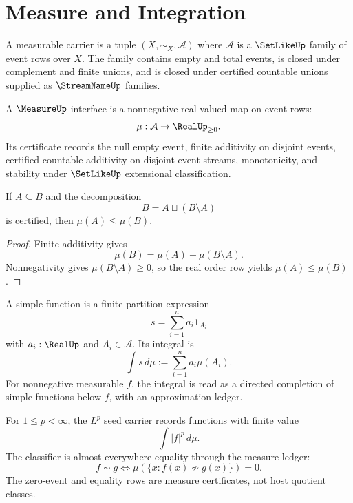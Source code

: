\section{Measure and Integration}
\label{sec:analysis-spine-measure}

\begin{definition}
\label{def:analysis-spine-measurable-carrier}
A measurable carrier is a tuple $(X,\sim_X,\mathcal A)$ where
$\mathcal A$ is a $\SetLikeUp$ family of event rows over $X$.  The family
contains empty and total events, is closed under complement and finite
unions, and is closed under certified countable unions supplied as
$\StreamNameUp$ families.
\end{definition}

\begin{definition}
\label{def:analysis-spine-measure-interface}
A $\MeasureUp$ interface is a nonnegative real-valued map on event rows:
$$
\mu:\mathcal A\to\RealUp_{\ge0}.
$$
Its certificate records the null empty event, finite additivity on disjoint
events, certified countable additivity on disjoint event streams,
monotonicity, and stability under $\SetLikeUp$ extensional classification.
\end{definition}

\begin{theorem}
\label{thm:analysis-spine-measure-monotonicity}
If $A\subseteq B$ and the decomposition
$$
B=A\sqcup(B\setminus A)
$$
is certified, then $\mu(A)\le\mu(B)$.
\end{theorem}

\begin{proof}
Finite additivity gives
$$
\mu(B)=\mu(A)+\mu(B\setminus A).
$$
Nonnegativity gives $\mu(B\setminus A)\ge0$, so the real order row yields
$\mu(A)\le\mu(B)$.
\end{proof}

\begin{definition}
\label{def:analysis-spine-simple-integral}
A simple function is a finite partition expression
$$
s=\sum_{i=1}^{n}a_i\mathbf 1_{A_i}
$$
with $a_i:\RealUp$ and $A_i\in\mathcal A$.  Its integral is
$$
\int s\,d\mu
:=
\sum_{i=1}^{n}a_i\mu(A_i).
$$
For nonnegative measurable $f$, the integral is read as a directed
completion of simple functions below $f$, with an approximation ledger.
\end{definition}

\begin{definition}[$L^p$ seed]
\label{def:analysis-spine-lp-seed}
For $1\le p<\infty$, the $L^p$ seed carrier records functions with finite
value
$$
\int |f|^p\,d\mu.
$$
The classifier is almost-everywhere equality through the measure ledger:
$$
f\sim g
\Longleftrightarrow
\mu(\{x:f(x)\not\sim g(x)\})=0.
$$
The zero-event and equality rows are measure certificates, not host quotient
classes.
\end{definition}

